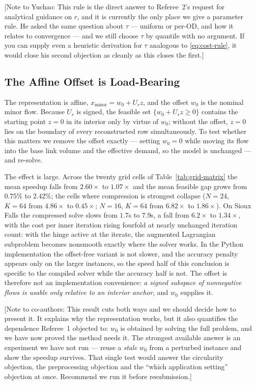 \documentclass[11pt]{article}
\newcommand{\conote}[1]{{\color{red}\small\textsf{[Note to co-authors: #1]}}}
\newcommand{\conoteY}[1]{{\color{red}\small\textsf{[Note to Yuchao: #1]}}}
\begin{document}
\conoteY{This rule is the direct answer to Referee~2's request for analytical guidance on
$r$, and it is currently the only place we give a parameter rule. He asked the same question
about $\tau$ --- uniform or per-OD, and how it relates to convergence --- and we still choose
$\tau$ by quantile with no argument. If you can supply even a heuristic derivation for $\tau$
analogous to \eqref{eq:cost-rule}, it would close his second objection as cleanly as this
closes the first.}


\subsection{The Affine Offset is Load-Bearing}
\label{sec:offset-study}


The representation is affine, $x_{\text{minor}}=w_0+U_rz$, and the offset $w_0$ is the
nominal minor flow. Because $U_r$ is signed, the feasible set $\{w_0+U_rz\ge0\}$ contains the
starting point $z=0$ in its interior only by virtue of $w_0$; without the offset, $z=0$ lies
on the boundary of every reconstructed row simultaneously. To test whether this matters we
remove the offset exactly --- setting $w_0=0$ while moving its flow into the base link volume
and the effective demand, so the model is unchanged --- and re-solve.

The effect is large. Across the twenty grid cells of Table~\ref{tab:grid-matrix} the mean
speedup falls from $2.60\times$ to $1.07\times$ and the mean feasible gap grows from $0.75\%$
to $2.42\%$; the cells where compression is strongest collapse ($N=24$, $K=64$ from
$4.86\times$ to $0.45\times$; $N=16$, $K=64$ from $6.82\times$ to $1.86\times$). On Sioux
Falls the compressed solve slows from $1.7$s to $7.9$s, a fall from $6.2\times$ to
$1.34\times$, with the cost per inner iteration rising fourfold at nearly unchanged iteration
count: with the hinge active at the iterate, the augmented Lagrangian subproblem becomes
nonsmooth exactly where the solver works. In the Python implementation the offset-free
variant is not slower, and the accuracy penalty appears only on the larger instances, so the
speed half of this conclusion is specific to the compiled solver while the accuracy half is
not. The offset is therefore not an implementation convenience: \emph{a signed subspace of
nonnegative flows is usable only relative to an interior anchor}, and $w_0$ supplies it.

\conote{This result cuts both ways and we should decide how to present it. It explains why the
representation works, but it also quantifies the dependence Referee~1 objected to: $w_0$ is
obtained by solving the full problem, and we have now proved the method needs it. The
strongest available answer is an experiment we have not run --- reuse a \emph{stale} $w_0$
from a perturbed instance and show the speedup survives. That single test would answer the
circularity objection, the preprocessing objection and the ``which application setting''
objection at once. Recommend we run it before resubmission.}
\end{document}
